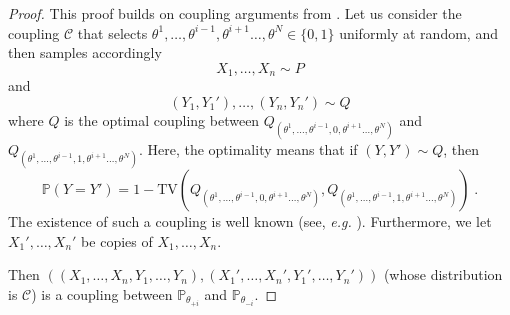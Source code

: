 \documentclass{article}
\theoremstyle{plain}
\theoremstyle{definition}
\theoremstyle{remark}
\newcommand{\Prob}[0]{\mathbb{P}}
\newcommand\tv[2]{\mathrm{TV}\left( {#1}, {#2} \right)}
\newcommand\p[1]{\left( {#1}\right)}
\begin{document}
\begin{proof}
This proof builds on coupling arguments from \cite{acharya2018differentially,acharya2021differentially,lalanne2022statistical}.
    Let us consider the coupling $\mathcal{C}$ that selects $\theta^1, \dots, \theta^{i-1}, \theta^{i+1} \dots, \theta^{N} \in \{0, 1 \}$ uniformly at random, and then 
    samples accordingly
    \begin{equation}
        X_1, \dots, X_n \sim P
    \end{equation}
    and
    \begin{equation}
        (Y_1, Y_1'), \dots, (Y_n, Y_n') \sim Q
    \end{equation}
    where $Q$ is the optimal coupling between $Q_{(\theta^1, \dots, \theta^{i-1}, 0, \theta^{i+1} \dots, \theta^{N})}$ and $Q_{(\theta^1, \dots, \theta^{i-1}, 1, \theta^{i+1} \dots, \theta^{N})}$. Here, the optimality means that if $(Y, Y') \sim Q$, then 
    \begin{equation}
        \Prob(Y = Y') = 1 -\tv{Q_{(\theta^1, \dots, \theta^{i-1}, 0, \theta^{i+1} \dots, \theta^{N})}}{Q_{(\theta^1, \dots, \theta^{i-1}, 1, \theta^{i+1} \dots, \theta^{N})}} \;.
    \end{equation}
    The existence of such a coupling is well known (see, \textit{e.g.} \cite{lindvall2002lectures}).
    Furthermore, we let $X_1', \dots, X_n'$ be copies of $X_1, \dots, X_n$.

    Then $\p{(X_1, \dots, X_n, Y_1, \dots, Y_n), (X_1', \dots, X_n', Y_1', \dots, Y_n')}$ (whose distribution is $\mathcal C$) is a coupling between $\Prob_{{{\theta_{+i}}}}$ and $\Prob_{{{\theta_{-i}}}}$.


\end{proof}
\end{document}
